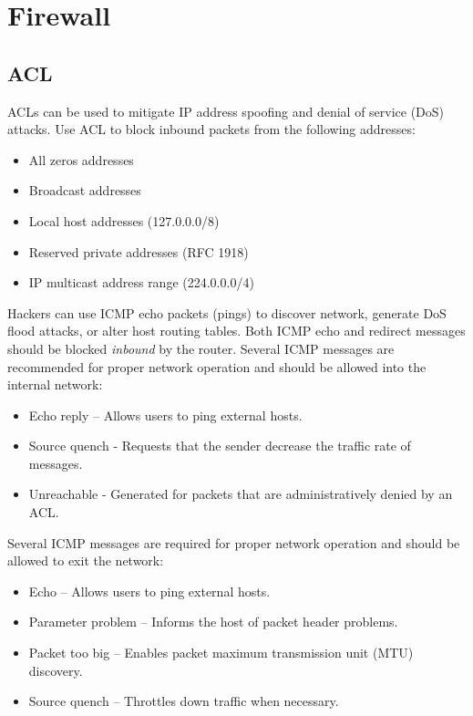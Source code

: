 \chapter{Firewall}

\section{ACL}

ACLs can be used to mitigate IP address spoofing and denial of service (DoS) attacks. Use ACL to block inbound packets from the following addresses:

\begin{itemize}
\item All zeros addresses
\item Broadcast addresses
\item Local host addresses (127.0.0.0/8)
\item Reserved private addresses (RFC 1918)
\item IP multicast address range (224.0.0.0/4)
\end{itemize}

Hackers can use ICMP echo packets (pings) to discover network, generate DoS flood attacks, or alter host routing tables. Both ICMP echo and redirect messages should be blocked \emph{inbound} by the router. Several ICMP messages are recommended for proper network operation and should be allowed into the internal network:

\begin{itemize}
\item Echo reply -- Allows users to ping external hosts.
\item Source quench - Requests that the sender decrease the traffic rate of messages.
\item Unreachable - Generated for packets that are administratively denied by an ACL.
\end{itemize}

Several ICMP messages are required for proper network operation and should be allowed to exit the network:

\begin{itemize}
\item Echo -- Allows users to ping external hosts.
\item Parameter problem -- Informs the host of packet header problems.
\item Packet too big -- Enables packet maximum transmission unit (MTU) discovery.
\item Source quench -- Throttles down traffic when necessary.
\end{itemize}

